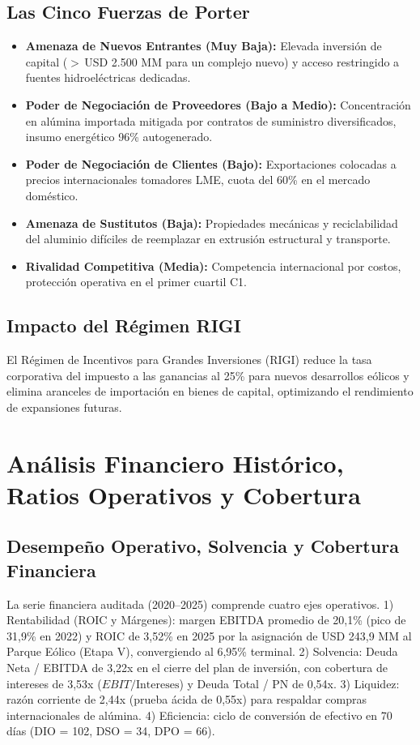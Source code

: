\documentclass[11pt,a4paper]{article}
\begin{document}
\subsection{Las Cinco Fuerzas de Porter}
\begin{itemize}
    \item \textbf{Amenaza de Nuevos Entrantes (Muy Baja):} Elevada inversión de capital ($>$\,USD 2.500 MM para un complejo nuevo) y acceso restringido a fuentes hidroeléctricas dedicadas.
    \item \textbf{Poder de Negociación de Proveedores (Bajo a Medio):} Concentración en alúmina importada mitigada por contratos de suministro diversificados, insumo energético 96\% autogenerado.
    \item \textbf{Poder de Negociación de Clientes (Bajo):} Exportaciones colocadas a precios internacionales tomadores LME, cuota del 60\% en el mercado doméstico.
    \item \textbf{Amenaza de Sustitutos (Baja):} Propiedades mecánicas y reciclabilidad del aluminio difíciles de reemplazar en extrusión estructural y transporte.
    \item \textbf{Rivalidad Competitiva (Media):} Competencia internacional por costos, protección operativa en el primer cuartil C1.
\end{itemize}

\subsection{Impacto del Régimen RIGI}
El Régimen de Incentivos para Grandes Inversiones (RIGI) reduce la tasa corporativa del impuesto a las ganancias al 25\% para nuevos desarrollos eólicos y elimina aranceles de importación en bienes de capital, optimizando el rendimiento de expansiones futuras.

\section{Análisis Financiero Histórico, Ratios Operativos y Cobertura}

\subsection{Desempeño Operativo, Solvencia y Cobertura Financiera}
La serie financiera auditada (2020--2025) comprende cuatro ejes operativos. 1) Rentabilidad (ROIC y Márgenes): margen EBITDA promedio de 20,1\% (pico de 31,9\% en 2022) y ROIC de 3,52\% en 2025 por la asignación de USD 243,9 MM al Parque Eólico (Etapa V), convergiendo al 6,95\% terminal. 2) Solvencia: Deuda Neta / EBITDA de 3,22x en el cierre del plan de inversión, con cobertura de intereses de 3,53x ($EBIT/\text{Intereses}$) y Deuda Total / PN de 0,54x. 3) Liquidez: razón corriente de 2,44x (prueba ácida de 0,55x) para respaldar compras internacionales de alúmina. 4) Eficiencia: ciclo de conversión de efectivo en 70 días (DIO = 102, DSO = 34, DPO = 66).
\end{document}
